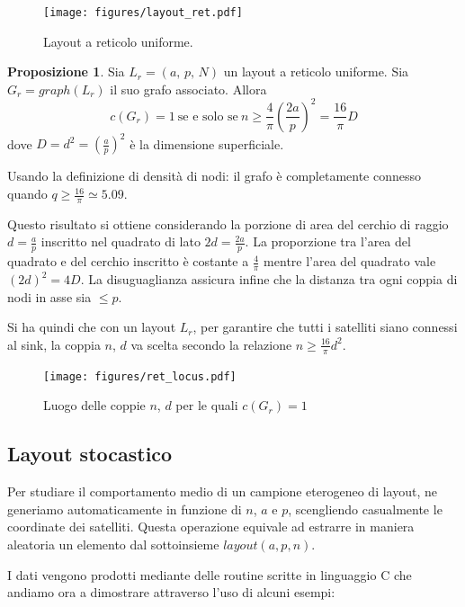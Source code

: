 \documentclass[a4paper,12pt]{article}
\theoremstyle{definition}
\newtheorem{proposition}{Proposizione}
\begin{document}
\begin{figure}[H]
\centering
\texttt{[image: figures/layout\_ret.pdf]}
\caption{Layout a reticolo uniforme.}
\end{figure}

\begin{proposition}
Sia $L_r = (a,\,p,\,N)$ un layout a reticolo uniforme. Sia $G_r = graph(L_r)$ il suo grafo associato. Allora
\begin{equation*}
c(G_r) = 1 \ \text{se e solo se} \ n \geq \frac{4}{\pi} \left(\frac{2a}{p}\right)^2 = \frac{16}{\pi} D
\end{equation*}
dove $D = d^2 = \left(\frac{a}{p}\right)^2$ è la dimensione superficiale.
\end{proposition}

Usando la definizione di densità di nodi: il grafo è completamente connesso quando $q \geq \frac{16}{\pi} \simeq 5.09$.

Questo risultato si ottiene considerando la porzione di area del cerchio di raggio $d = \frac{a}{p}$ inscritto nel quadrato di lato $2d = \frac{2a}{p}$. La proporzione tra l'area del quadrato e del cerchio inscritto è costante a $\frac{4}{\pi}$ mentre l'area del quadrato vale $(2d)^2 = 4D$. La disuguaglianza assicura infine che la distanza tra ogni coppia di nodi in asse sia $\leq p$.

Si ha quindi che con un layout $L_r$, per garantire che tutti i satelliti siano connessi al sink, la coppia $n$, $d$ va scelta secondo la relazione $n \geq \frac{16}{\pi} d^2$.

\begin{figure}[H]
\centering
\texttt{[image: figures/ret\_locus.pdf]}
\caption{Luogo delle coppie $n$, $d$ per le quali $c(G_r) = 1$}
\end{figure}

\subsection{Layout stocastico}

Per studiare il comportamento medio di un campione eterogeneo di layout, ne generiamo automaticamente in funzione di $n$, $a$ e $p$, scengliendo casualmente le coordinate dei satelliti. Questa operazione equivale ad estrarre in maniera aleatoria un elemento dal sottoinsieme $layout(a, p, n)$.

I dati vengono prodotti mediante delle routine scritte in linguaggio C che andiamo ora a dimostrare attraverso l'uso di alcuni esempi:
\end{document}
